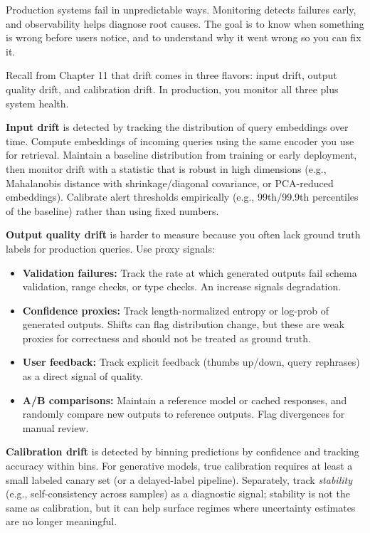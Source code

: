 Production systems fail in unpredictable ways. Monitoring detects failures early, and observability helps diagnose root causes. The goal is to know when something is wrong before users notice, and to understand why it went wrong so you can fix it.

Recall from Chapter 11 that drift comes in three flavors: input drift, output quality drift, and calibration drift. In production, you monitor all three plus system health.

\textbf{Input drift} is detected by tracking the distribution of query embeddings over time. Compute embeddings of incoming queries using the same encoder you use for retrieval. Maintain a baseline distribution from training or early deployment, then monitor drift with a statistic that is robust in high dimensions (e.g., Mahalanobis distance with shrinkage/diagonal covariance, or PCA-reduced embeddings). Calibrate alert thresholds empirically (e.g., 99th/99.9th percentiles of the baseline) rather than using fixed numbers.

\textbf{Output quality drift} is harder to measure because you often lack ground truth labels for production queries. Use proxy signals:

\begin{itemize}
\item \textbf{Validation failures:} Track the rate at which generated outputs fail schema validation, range checks, or type checks. An increase signals degradation.
\item \textbf{Confidence proxies:} Track length-normalized entropy or log-prob of generated outputs. Shifts can flag distribution change, but these are weak proxies for correctness and should not be treated as ground truth.
\item \textbf{User feedback:} Track explicit feedback (thumbs up/down, query rephrases) as a direct signal of quality.
\item \textbf{A/B comparisons:} Maintain a reference model or cached responses, and randomly compare new outputs to reference outputs. Flag divergences for manual review.
\end{itemize}

\textbf{Calibration drift} is detected by binning predictions by confidence and tracking accuracy within bins. For generative models, true calibration requires at least a small labeled canary set (or a delayed-label pipeline). Separately, track \emph{stability} (e.g., self-consistency across samples) as a diagnostic signal; stability is not the same as calibration, but it can help surface regimes where uncertainty estimates are no longer meaningful.

